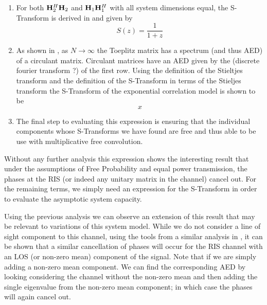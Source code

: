 \begin{enumerate}
\item 
	For both $\mathbf{H}_{2}^H \mathbf{H}_{2}$ and $\mathbf{H}_{1}\mathbf{H}_{1}^H$ with all system dimensions equal, the S-Transform is derived in \cite{} and given by 
	\begin{equation}
	S(z) = \frac{1}{1+z}
	\end{equation}
\item 
	As shown in \cite{}, as $N \rightarrow \infty$ the  Toeplitz matrix has a spectrum (and thus AED) of a circulant matrix. Circulant matrices have an AED 
	given by the (discrete fourier transform ?) of the first row. Using the definition of the Stieltjes transform and the definition of the S-Transform in terms of the Stieljes transform the S-Transform of the exponential correlation model is shown to be
	\begin{equation}
	x
	\end{equation}
\item
	The final step to evaluating this expression is ensuring that the individual components whose S-Transforms we have found are free and thus able to be use with multiplicative free convolution. 	
\end{enumerate}
\par
Without any further analysis this expression shows the interesting result that under the assumptions of Free Probability and equal power transmission, the phases at the RIS (or indeed any unitary matrix in the channel) cancel out. For the remaining terms, we simply need an expression for the S-Transform in order to evaluate the asymptotic system capacity.
\par 
Using the previous analysis we can observe an extension of this result that may be relevant to variations of this system model. 
While we do not consider a line of sight component to this channel, using the tools from a similar analysis in \cite{}, it can be shown that 
a similar cancellation of phases will occur for the RIS channel with an LOS (or non-zero mean) component of the signal.
Note that if we are simply adding a non-zero mean component. We can find the corresponding AED by looking considering the channel without the non-zero mean and then adding the single eigenvalue from the non-zero mean component; in which case the phases will again cancel out. 



